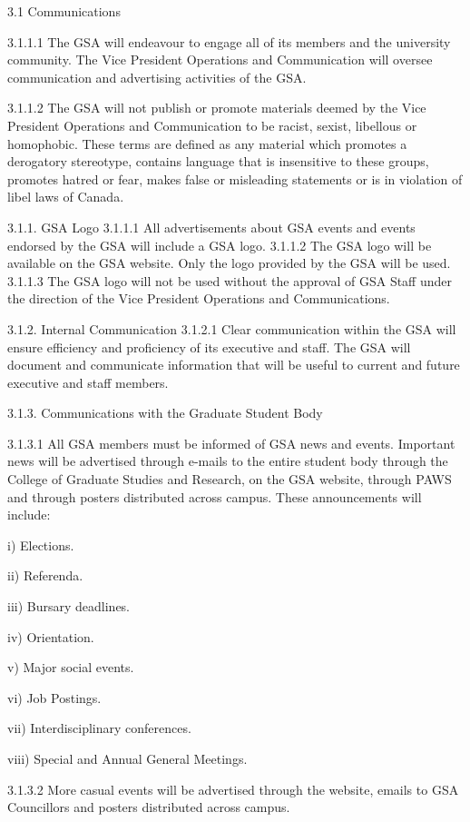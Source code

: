 ﻿3.1 Communications 
 
 3.1.1.1 The GSA will endeavour to engage all of its members and the university community. The Vice President Operations and Communication will oversee communication and advertising activities of the GSA. 
 
 3.1.1.2 The GSA will not publish or promote materials deemed by the Vice 
 President Operations and Communication to be racist, sexist, libellous or 
 homophobic. These terms are defined as any material which promotes a 
 derogatory stereotype, contains language that is insensitive to these groups, 
 promotes hatred or fear, makes false or misleading statements or is in 
 violation of libel laws of Canada. 
 
 3.1.1. GSA Logo 
 3.1.1.1 All advertisements about GSA events and events endorsed by the GSA 
 will include a GSA logo. 
 3.1.1.2 The GSA logo will be available on the GSA website. Only the logo 
 provided by the GSA will be used. 
 3.1.1.3 The GSA logo will not be used without the approval of GSA Staff under 
 the direction of the Vice President Operations and Communications. 
 
 3.1.2. Internal Communication 
 3.1.2.1 Clear communication within the GSA will ensure efficiency and 
 proficiency of its executive and staff. The GSA will document and 
 communicate information that will be useful to current and future executive 
 and staff members. 
 
 3.1.3. Communications with the Graduate Student Body 
 
 3.1.3.1 All GSA members must be informed of GSA news and events. 
 Important news will be advertised through e-mails to the entire student body 
 through the College of Graduate Studies and Research, on the GSA website, 
 through PAWS and through posters distributed across campus. These 
 announcements will include: 
 
 i) Elections. 
 
 ii) Referenda. 

 iii) Bursary deadlines. 
 
 iv) Orientation. 
 
 v) Major social events. 
 
 vi) Job Postings. 
 
 vii) Interdisciplinary conferences. 
 
 viii) Special and Annual General Meetings. 
 
 3.1.3.2 More casual events will be advertised through the website, emails to 
 GSA Councillors and posters distributed across campus. 
 
